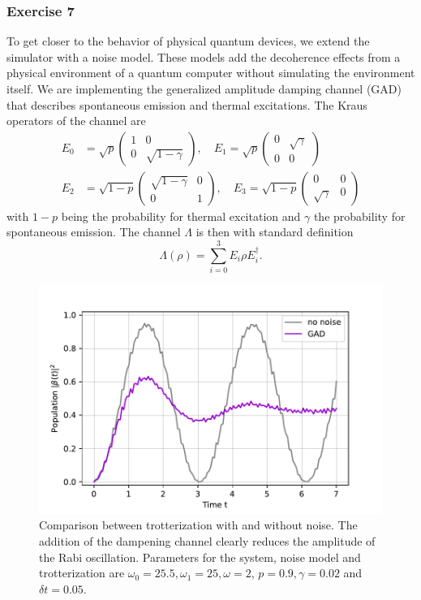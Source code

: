\subsubsection{Exercise 7}
To get closer to the behavior of physical quantum devices, we extend the simulator with a noise model. These models add the decoherence effects from a physical environment of a quantum computer without simulating the environment itself. We are implementing the generalized amplitude damping channel (GAD) that describes spontaneous emission and thermal excitations. The Kraus operators of the channel are
\begin{align*}
    E_0 &= \sqrt{p}
    \begin{pmatrix}
        1 & 0 \\
        0 & \sqrt{1 - \gamma}
    \end{pmatrix}
    , \quad E_1 = \sqrt{p}
    \begin{pmatrix}
        0 & \sqrt{\gamma} \\
        0 & 0
    \end{pmatrix}
    \\ E_2 & = \sqrt{1-p}
    \begin{pmatrix}
        \sqrt{1-\gamma} & 0 \\
        0 & 1
    \end{pmatrix}
    , \quad E_3 = \sqrt{1-p}
    \begin{pmatrix}
        0 & 0 \\
        \sqrt{\gamma} & 0
    \end{pmatrix}
\end{align*}
with $1-p$ being the probability for thermal excitation and $\gamma$ the probability for spontaneous emission. The channel $\Lambda$ is then with standard definition
\begin{equation}
    \Lambda(\rho) = \sum^3_{i=0} E_i \rho E^\dagger_i .
\end{equation}
\begin{figure}[h]
    \centering
    \includegraphics[width=0.7\linewidth]{tex/figures/exercise07_01.pdf}
    \caption{Comparison between trotterization with and without noise. The addition of the dampening channel clearly reduces the amplitude of the Rabi oscillation. Parameters for the system, noise model and trotterization are $\omega_0 = 25.5, \omega_1 = 25, \omega = 2$, $p = 0.9, \gamma = 0.02$ and $\delta t = 0.05$.}
    \label{fig:exercise07_01}
\end{figure}
